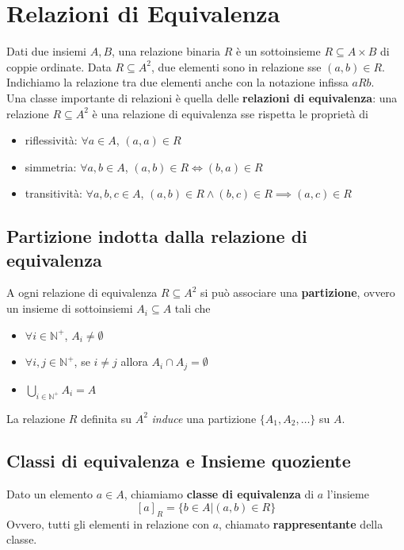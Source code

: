 \section{Relazioni di Equivalenza}
Dati due insiemi $A,B$, una relazione binaria $R$ è un sottoinsieme $R \subseteq A \times B$ di coppie ordinate. Data $R \subseteq A^2$, due elementi sono in relazione sse $(a,b) \in R$. Indichiamo la relazione tra due elementi anche con la notazione infissa $aRb$. \\

Una classe importante di relazioni è quella delle \textbf{relazioni di equivalenza}: una relazione $R \subseteq A^2$ è una relazione di equivalenza sse rispetta le proprietà di
\begin{itemize}
	\item riflessività: $\forall a \in A$, $(a,a) \in R$
	\item simmetria: $\forall a,b \in A$, $(a,b) \in R \Leftrightarrow (b,a) \in R$
	\item transitività: $\forall a,b,c \in A$, $(a,b) \in R \wedge (b,c) \in R \implies (a,c) \in R$
\end{itemize}

\subsection{Partizione indotta dalla relazione di equivalenza}
A ogni relazione di equivalenza $R \subseteq A^2$ si può associare una \textbf{partizione}, ovvero un insieme di sottoinsiemi $A_i \subseteq A$ tali che
\begin{itemize}
	\item $\forall i \in \mathbb{N}^+$, $A_i \neq \emptyset$
	\item $\forall i,j \in \mathbb{N}^+$, se $i \neq j$ allora $A_i \cap A_j = \emptyset$
	\item $\bigcup_{i \in \mathbb{N}^+} A_i = A$
\end{itemize}

La relazione $R$ definita su $A^2$ \textit{induce} una partizione $\{A_1, A_2, \dots\}$ su $A$.\\

\subsection{Classi di equivalenza e Insieme quoziente}
Dato un elemento $a \in A$, chiamiamo \textbf{classe di equivalenza} di $a$ l'insieme
$$ [a]_R = \{b \in A | (a,b) \in R \} $$
Ovvero, tutti gli elementi in relazione con $a$, chiamato \textbf{rappresentante} della classe. \\

